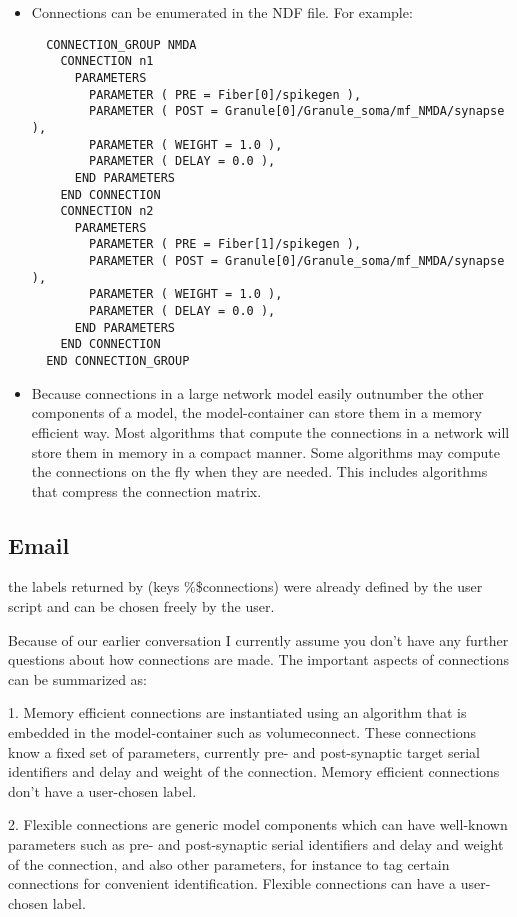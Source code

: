 \documentclass[12pt]{article}
\begin{document}
\begin{itemize}
\item Connections can be enumerated in the NDF file.  For example:
\begin{verbatim}
  CONNECTION_GROUP NMDA
    CONNECTION n1
      PARAMETERS
        PARAMETER ( PRE = Fiber[0]/spikegen ),
        PARAMETER ( POST = Granule[0]/Granule_soma/mf_NMDA/synapse ),
        PARAMETER ( WEIGHT = 1.0 ),
        PARAMETER ( DELAY = 0.0 ),
      END PARAMETERS
    END CONNECTION
    CONNECTION n2
      PARAMETERS
        PARAMETER ( PRE = Fiber[1]/spikegen ),
        PARAMETER ( POST = Granule[0]/Granule_soma/mf_NMDA/synapse ),
        PARAMETER ( WEIGHT = 1.0 ),
        PARAMETER ( DELAY = 0.0 ),
      END PARAMETERS
    END CONNECTION
  END CONNECTION_GROUP
\end{verbatim}
\item Because connections in a large network model easily outnumber
  the other components of a model, the model-container can store them
  in a memory efficient way.  Most algorithms that compute the
  connections in a network will store them in memory in a compact
  manner.  Some algorithms may compute the connections on the fly when
  they are needed.  This includes algorithms that compress the
  connection matrix.
\end{itemize}



\subsection*{Email}

the labels returned by (keys \%\$connections)
were already defined by the user script and can be chosen freely by
the user.

Because of our earlier conversation I currently assume you don't have
any further questions about how connections are made.  The important
aspects of connections can be summarized as:

1. Memory efficient connections are instantiated using an algorithm
that is embedded in the model-container such as volumeconnect.  These
connections know a fixed set of parameters, currently pre- and
post-synaptic target serial identifiers and delay and weight of the
connection.  Memory efficient connections don't have a user-chosen
label.

2. Flexible connections are generic model components which can have
well-known parameters such as pre- and post-synaptic serial
identifiers and delay and weight of the connection, and also other
parameters, for instance to tag certain connections for convenient
identification.  Flexible connections can have a user-chosen label.
\end{document}
